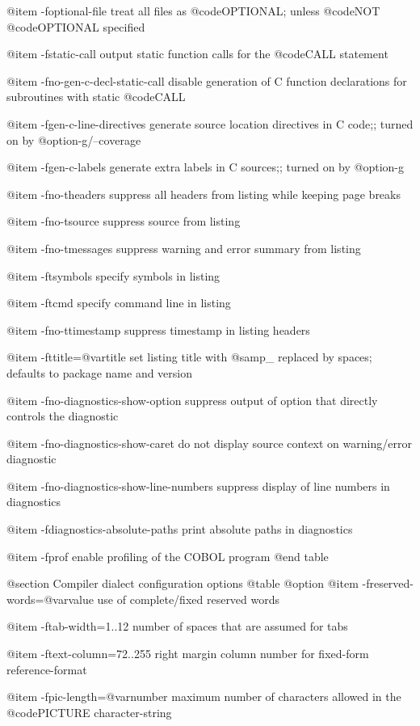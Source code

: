 @item -foptional-file
treat all files as @code{OPTIONAL}; unless @code{NOT} @code{OPTIONAL} specified

@item -fstatic-call
output static function calls for the @code{CALL} statement

@item -fno-gen-c-decl-static-call
disable generation of C function declarations
for subroutines with static @code{CALL}

@item -fgen-c-line-directives
generate source location directives in C code;; turned on by @option{-g}/--coverage

@item -fgen-c-labels
generate extra labels in C sources;; turned on by @option{-g}

@item -fno-theaders
suppress all headers from listing while keeping
page breaks

@item -fno-tsource
suppress source from listing

@item -fno-tmessages
suppress warning and error summary from listing

@item -ftsymbols
specify symbols in listing

@item -ftcmd
specify command line in listing

@item -fno-ttimestamp
suppress timestamp in listing headers

@item -fttitle=@var{title}
set listing title with @samp{_} replaced by spaces;
defaults to package name and version

@item -fno-diagnostics-show-option
suppress output of option that directly
controls the diagnostic

@item -fno-diagnostics-show-caret
do not display source context on warning/error diagnostic

@item -fno-diagnostics-show-line-numbers
suppress display of line numbers in diagnostics

@item -fdiagnostics-absolute-paths
print absolute paths in diagnostics

@item -fprof
enable profiling of the COBOL program
@end table

@section Compiler dialect configuration options
@table @option
@item -freserved-words=@var{value}
use of complete/fixed reserved words

@item -ftab-width=1..12
number of spaces that are assumed for tabs

@item -ftext-column=72..255
right margin column number for fixed-form reference-format

@item -fpic-length=@var{number}
maximum number of characters allowed in the @code{PICTURE} character-string

